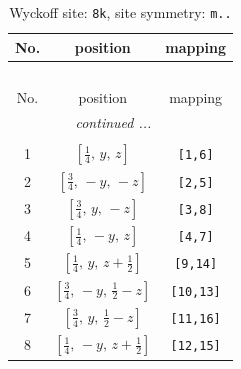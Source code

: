 \documentclass[fleqn,8pt]{jsarticle}
\begin{document}
\begin{longtable}{ccc}
\caption{Wyckoff site: {\tt 8k}, site symmetry: {\tt m..}}
 \\
 \hline \hline
No. & position & mapping \\ \hline \endfirsthead

\multicolumn{2}{l}{\tablename\ \thetable{}} \\
 \hline \hline
No. & position & mapping \\ \hline \endhead

 \hline \hline
\multicolumn{2}{r}{\footnotesize\it continued ...} \\ \endfoot

 \hline \hline
\multicolumn{2}{r}{} \\ \endlastfoot

1 & $\left[ \frac{1}{4},\, y,\, z \right]$ & {\tt [1,6]} \\ \hline
2 & $\left[ \frac{3}{4},\, - y,\, - z \right]$ & {\tt [2,5]} \\ \hline
3 & $\left[ \frac{3}{4},\, y,\, - z \right]$ & {\tt [3,8]} \\ \hline
4 & $\left[ \frac{1}{4},\, - y,\, z \right]$ & {\tt [4,7]} \\ \hline
5 & $\left[ \frac{1}{4},\, y,\, z + \frac{1}{2} \right]$ & {\tt [9,14]} \\ \hline
6 & $\left[ \frac{3}{4},\, - y,\, \frac{1}{2} - z \right]$ & {\tt [10,13]} \\ \hline
7 & $\left[ \frac{3}{4},\, y,\, \frac{1}{2} - z \right]$ & {\tt [11,16]} \\ \hline
8 & $\left[ \frac{1}{4},\, - y,\, z + \frac{1}{2} \right]$ & {\tt [12,15]} \\
\end{longtable}
\renewcommand{\arraystretch}{1.2}
\end{document}
